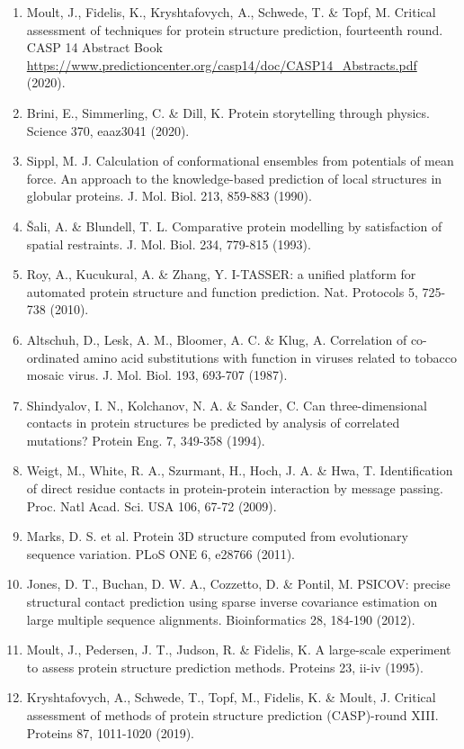 \documentclass[10pt]{article}
\begin{document}
\begin{enumerate}
  \item Moult, J., Fidelis, K., Kryshtafovych, A., Schwede, T. \& Topf, M. Critical assessment of techniques for protein structure prediction, fourteenth round. CASP 14 Abstract Book \href{https://www.predictioncenter.org/casp14/doc/CASP14_Abstracts.pdf}{https://www.predictioncenter.org/casp14/doc/CASP14\_Abstracts.pdf} (2020).
  \item Brini, E., Simmerling, C. \& Dill, K. Protein storytelling through physics. Science 370, eaaz3041 (2020).
  \item Sippl, M. J. Calculation of conformational ensembles from potentials of mean force. An approach to the knowledge-based prediction of local structures in globular proteins. J. Mol. Biol. 213, 859-883 (1990).
  \item Šali, A. \& Blundell, T. L. Comparative protein modelling by satisfaction of spatial restraints. J. Mol. Biol. 234, 779-815 (1993).
  \item Roy, A., Kucukural, A. \& Zhang, Y. I-TASSER: a unified platform for automated protein structure and function prediction. Nat. Protocols 5, 725-738 (2010).
  \item Altschuh, D., Lesk, A. M., Bloomer, A. C. \& Klug, A. Correlation of co-ordinated amino acid substitutions with function in viruses related to tobacco mosaic virus. J. Mol. Biol. 193, 693-707 (1987).
  \item Shindyalov, I. N., Kolchanov, N. A. \& Sander, C. Can three-dimensional contacts in protein structures be predicted by analysis of correlated mutations? Protein Eng. 7, 349-358 (1994).
  \item Weigt, M., White, R. A., Szurmant, H., Hoch, J. A. \& Hwa, T. Identification of direct residue contacts in protein-protein interaction by message passing. Proc. Natl Acad. Sci. USA 106, 67-72 (2009).
  \item Marks, D. S. et al. Protein 3D structure computed from evolutionary sequence variation. PLoS ONE 6, e28766 (2011).
  \item Jones, D. T., Buchan, D. W. A., Cozzetto, D. \& Pontil, M. PSICOV: precise structural contact prediction using sparse inverse covariance estimation on large multiple sequence alignments. Bioinformatics 28, 184-190 (2012).
  \item Moult, J., Pedersen, J. T., Judson, R. \& Fidelis, K. A large-scale experiment to assess protein structure prediction methods. Proteins 23, ii-iv (1995).
  \item Kryshtafovych, A., Schwede, T., Topf, M., Fidelis, K. \& Moult, J. Critical assessment of methods of protein structure prediction (CASP)-round XIII. Proteins 87, 1011-1020 (2019).

\end{enumerate}
\end{document}
